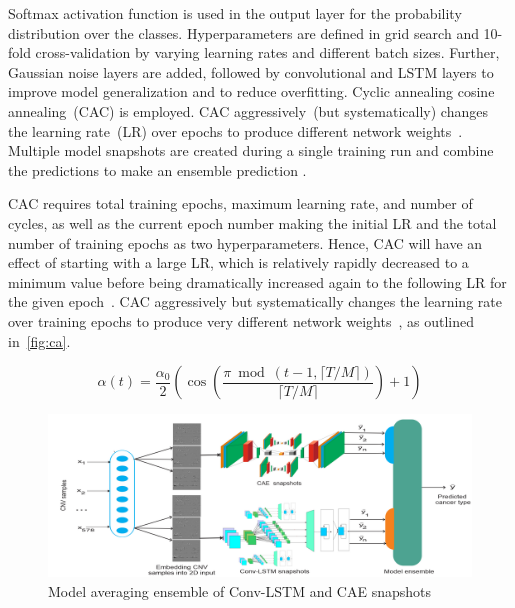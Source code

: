 \hspace*{3.5mm} Softmax activation function is used in the output layer for the probability distribution over the classes. Hyperparameters are defined in grid search and 10-fold cross-validation by varying learning rates and different batch sizes. Further, Gaussian noise layers are added, followed by convolutional and LSTM layers to improve model generalization and to reduce overfitting. 
Cyclic annealing cosine annealing~(CAC) is employed. CAC  aggressively~(but systematically) changes the learning rate~(LR) over epochs to produce different network weights~\cite{loshchilov2016sgdr}. Multiple model snapshots are created during a single training run and combine the predictions to make an ensemble prediction \cite{huang2017snapshot}. 

\hspace*{3.5mm} CAC requires total training epochs, maximum learning rate, and number of cycles, as well as the current epoch number making the initial LR and the total number of training epochs as two hyperparameters. Hence, CAC will have an effect of starting with a large LR, which is relatively rapidly decreased to a minimum value before being dramatically increased again to the following LR for the given epoch~\cite{huang2017snapshot}. CAC aggressively but systematically changes the learning rate over training epochs to produce very different network weights~\cite{loshchilov2016sgdr}, as outlined in~\cref{fig:ca}. 

\begin{equation}
    \label{eq:lr-cosine}
    \alpha(t)=\frac{\alpha_{0}}{2}\left(\cos \left(\frac{\pi \bmod (t-1,\lceil T / M\rceil)}{\lceil T / M\rceil}\right)+1\right)
\end{equation}

\begin{figure}
    \centering
        \includegraphics[scale=0.65]{images/ensemble.png}
    \caption{Model averaging ensemble of Conv-LSTM and CAE snapshots~\cite{karimACCA2019}}
    \label{fig:mae}
    \vspace{-2mm}
\end{figure}

